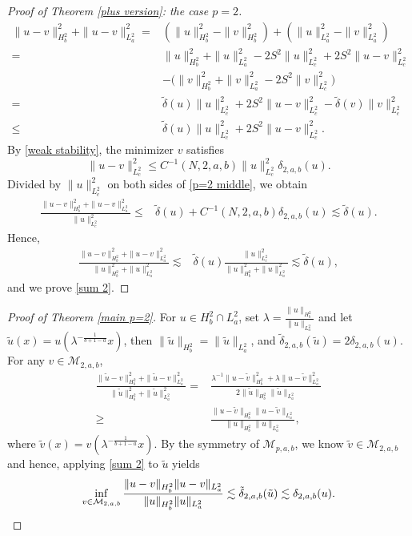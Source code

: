 \documentclass[11pt]{article}
\numberwithin{equation}{section}
\begin{document}
\begin{proof}[Proof of Theorem \ref{plus version}: the case $p=2$]
    \begin{equation}\label{p=2 middle}
        \begin{aligned}
            \|u-v\|_{H_b^2}^2 + \|u-v\|_{L^2_a}^2 ={}& (\|u\|_{H_b^2}^2-\|v\|_{H_b^2}^2) + (\|u\|_{L^2_a}^2-\|v\|_{L^2_a}^2) \\
            ={}& \|u\|_{H_b^2}^2 + \|u\|_{L_a^2}^2 - 2S^2 \|u\|_{L_c^2}^2 + 2S^2\|u-v\|_{L^2_c}^2 \\
        & - \big( \|v\|_{H_b^2}^2+\|v\|_{L_a^2}^2 - 2S^2\|v\|_{L^2_c}^2 \big)\\
            ={}& \tilde{\delta}(u)\|u\|_{L^2_c}^2 + 2S^2\|u-v\|_{L^2_c}^2 - \tilde{\delta}(v)\|v\|_{L^2_c}^2\\
        \le{}& \tilde{\delta}(u)\|u\|_{L^2_c}^2 + 2S^2\|u-v\|_  {L^2_c}^2.
        \end{aligned}
    \end{equation}
    By \eqref{weak stability}, the minimizer $v$ satisfies
    \[ \|u-v\|_{L^2_c}^2 \le C^{-1}(N,2,a,b)\|u\|_{L^2_c}^2\delta_{2,a,b}(u).\]
    Divided by $\|u\|_{L^2_c}^2$ on both sides of \eqref{p=2 middle}, we obtain
    \begin{align*}
        \frac{\|u-v\|_{H^2_b}^2+\|u-v\|_{L^2_a}^2}{\|u\|_{L^2_c}^2} \le{}& \tilde{\delta}(u) + C^{-1}(N,2,a,b)\delta_{2,a,b}(u) \lesssim \tilde{\delta}(u).
    \end{align*}
    Hence,
    \begin{align*}
        \frac{\|u-v\|_{H^2_b}^2+\|u-v\|_{L^2_a}^2}{\|u\|_{H^2_b}^2+\|u\|_{L^2_a}^2} \lesssim{}& \tilde{\delta}(u)\frac{\|u\|_{L^2_c}^2}{\|u\|_{H^2_b}^2+\|u\|_{L^2_a}^2} \lesssim \tilde{\delta}(u),
    \end{align*}
    and we prove \eqref{sum 2}.
\end{proof}
\begin{proof}[Proof of Theorem \ref{main p=2}]
    For $u\in H^2_b \cap L^2_a$, set $\lambda = \frac{\|u\|_{H^2_b}}{\|u\|_{L^2_a}}$ and let $\tilde{u}(x) = u(\lambda^{-\frac{1}{b+1-a}} x)$, then $\|\tilde{u}\|_{H^2_b} = \|\tilde{u}\|_{L^2_a}$, and $\tilde{\delta}_{2,a,b}(\tilde{u}) = 2\delta_{2,a,b}(u)$. For any $v\in \mathcal{M}_{2,a,b}$,
    \begin{align*}
            \frac{\|\tilde{u}-v\|_{H_b^2}^2 + \|\tilde{u}-v\|_{L^2_a}^2}{\|\tilde{u}\|_{H^2_b}^2 + \|\tilde{u}\|_{L^2_a}^2} ={}& \frac{\lambda^{-1}\|u-\tilde{v}\|_{H^2_b}^2 +\lambda \|u-\tilde{v}\|_{L^2_a}^2}{2\|\tilde{u}\|_{H^2_b}\|\tilde{u}\|_{L^2_a}} \\
            \ge{}& \frac{\|u-\tilde{v}\|_{H^2_b}\|u-\tilde{v}\|_{L^2_a}}{\|u\|_{H_b^2}\|u\|_{L^2_a}},
    \end{align*}
    where $\tilde{v}(x) = v(\lambda^{-\frac{1}{b+1-a}}x)$. By the symmetry of $\mathcal{M}_{p,a,b}$, we know $\tilde{v}\in\mathcal{M}_{2,a,b}$ and hence, applying \eqref{sum 2} to $\tilde{u}$ yields
    \[ \inf_{v\in\mathcal{M}_{2,a,b}} \frac{\|u-v\|_{H^2_b}\|u-v\|_{L^2_a}}{\|u\|_{H^2_b}\|u\|_{L^2_a}} \lesssim \tilde{\delta}_{2,a,b}(\tilde{u}) \lesssim \delta_{2,a,b}(u). \qedhere\]
\end{proof}
\end{document}
